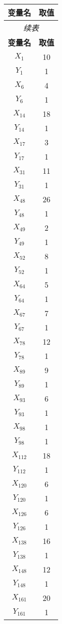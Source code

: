 \documentclass[a4paper,10pt]{article}
\begin{document}
\begin{center}
\begin{longtable}{cc}
\toprule
\textbf{变量名} & \textbf{取值} \\
\midrule
\endfirsthead
\multicolumn{2}{c}{\textit{续表}} \\
\toprule
\textbf{变量名} & \textbf{取值} \\
\midrule
\endhead
\bottomrule
\endfoot
\bottomrule
\endlastfoot
$X_{1}$ & 10 \\
$Y_{1}$ & 1 \\
$X_{6}$ & 4 \\
$Y_{6}$ & 1 \\
$X_{14}$ & 18 \\
$Y_{14}$ & 1 \\
$X_{17}$ & 3 \\
$Y_{17}$ & 1 \\
$X_{31}$ & 11 \\
$Y_{31}$ & 1 \\
$X_{48}$ & 26 \\
$Y_{48}$ & 1 \\
$X_{49}$ & 2 \\
$Y_{49}$ & 1 \\
$X_{52}$ & 8 \\
$Y_{52}$ & 1 \\
$X_{64}$ & 5 \\
$Y_{64}$ & 1 \\
$X_{67}$ & 7 \\
$Y_{67}$ & 1 \\
$X_{78}$ & 12 \\
$Y_{78}$ & 1 \\
$X_{89}$ & 9 \\
$Y_{89}$ & 1 \\
$X_{93}$ & 6 \\
$Y_{93}$ & 1 \\
$X_{98}$ & 1 \\
$Y_{98}$ & 1 \\
$X_{112}$ & 18 \\
$Y_{112}$ & 1 \\
$X_{120}$ & 6 \\
$Y_{120}$ & 1 \\
$X_{126}$ & 6 \\
$Y_{126}$ & 1 \\
$X_{138}$ & 16 \\
$Y_{138}$ & 1 \\
$X_{148}$ & 12 \\
$Y_{148}$ & 1 \\
$X_{161}$ & 20 \\
$Y_{161}$ & 1 \\
\end{longtable}
\end{center}
\end{document}
